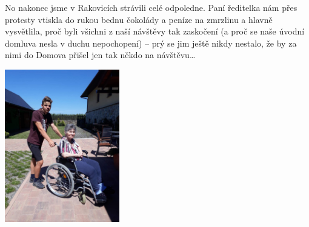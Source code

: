 No nakonec jsme v Rakovicích strávili celé odpoledne. Paní ředitelka nám přes protesty vtiskla do rukou bednu čokolády a peníze na zmrzlinu a hlavně vysvětlila, proč byli všichni z naší návštěvy tak zaskočení (a proč se naše úvodní domluva nesla v duchu nepochopení) – prý se jim ještě nikdy nestalo, že by za nimi do Domova přišel jen tak někdo na návštěvu…


\begin{center}

\includegraphics[width=5cm]{img/rovero_clanky/rizek_s_babou.jpg}

\end{center}

